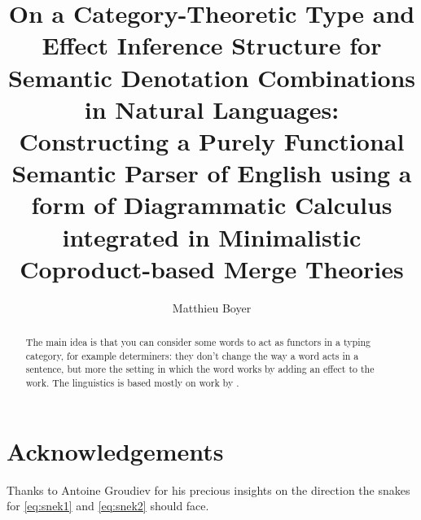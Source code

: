 \documentclass[math, english, info]{cours}
\title{On a Category-Theoretic Type and Effect Inference Structure for Semantic Denotation Combinations in Natural Languages:\\ Constructing a Purely Functional Semantic Parser of English using a form of Diagrammatic Calculus integrated in Minimalistic Coproduct-based Merge Theories}
\author{Matthieu Boyer}
\begin{document}
\maketitle
\tableofcontents

\begin{abstract}
	The main idea is that you can consider some words to act as functors in a typing category, for example determiners:
	they don't change the way a word acts in a sentence,
	but more the setting in which the word works by adding an effect to the work.
	The linguistics is based mostly on work by .
\end{abstract}










\section*{Acknowledgements}
Thanks to Antoine Groudiev for his precious insights on the direction the snakes for \eqref{eq:snek1} and \eqref{eq:snek2} should face.

\clearpage
\appendix








\end{document}
